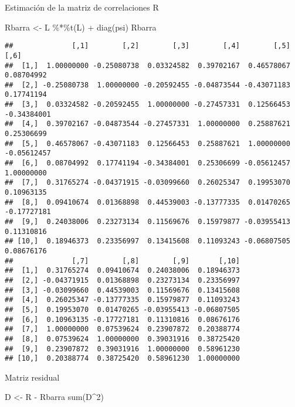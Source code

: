 \documentclass[
]{article}
\newenvironment{Shaded}{\begin{snugshade}}{\end{snugshade}}
\newcommand{\DecValTok}[1]{\textcolor[rgb]{0.00,0.00,0.81}{#1}}
\newcommand{\FunctionTok}[1]{\textcolor[rgb]{0.00,0.00,0.00}{#1}}
\newcommand{\NormalTok}[1]{#1}
\newcommand{\OtherTok}[1]{\textcolor[rgb]{0.56,0.35,0.01}{#1}}
\newcommand{\SpecialCharTok}[1]{\textcolor[rgb]{0.00,0.00,0.00}{#1}}
\begin{document}
Estimación de la matriz de correlaciones R

\begin{Shaded}
\begin{Highlighting}[]
\NormalTok{Rbarra }\OtherTok{\textless{}{-}}\NormalTok{ L }\SpecialCharTok{\%*\%}\FunctionTok{t}\NormalTok{(L) }\SpecialCharTok{+} \FunctionTok{diag}\NormalTok{(psi)}
\NormalTok{Rbarra}
\end{Highlighting}
\end{Shaded}

\begin{verbatim}
##              [,1]        [,2]        [,3]        [,4]        [,5]        [,6]
##  [1,]  1.00000000 -0.25080738  0.03324582  0.39702167  0.46578067  0.08704992
##  [2,] -0.25080738  1.00000000 -0.20592455 -0.04873544 -0.43071183  0.17741194
##  [3,]  0.03324582 -0.20592455  1.00000000 -0.27457331  0.12566453 -0.34384001
##  [4,]  0.39702167 -0.04873544 -0.27457331  1.00000000  0.25887621  0.25306699
##  [5,]  0.46578067 -0.43071183  0.12566453  0.25887621  1.00000000 -0.05612457
##  [6,]  0.08704992  0.17741194 -0.34384001  0.25306699 -0.05612457  1.00000000
##  [7,]  0.31765274 -0.04371915 -0.03099660  0.26025347  0.19953070  0.10963135
##  [8,]  0.09410674  0.01368898  0.44539003 -0.13777335  0.01470265 -0.17727181
##  [9,]  0.24038006  0.23273134  0.11569676  0.15979877 -0.03955413  0.11310816
## [10,]  0.18946373  0.23356997  0.13415608  0.11093243 -0.06807505  0.08676176
##              [,7]        [,8]        [,9]       [,10]
##  [1,]  0.31765274  0.09410674  0.24038006  0.18946373
##  [2,] -0.04371915  0.01368898  0.23273134  0.23356997
##  [3,] -0.03099660  0.44539003  0.11569676  0.13415608
##  [4,]  0.26025347 -0.13777335  0.15979877  0.11093243
##  [5,]  0.19953070  0.01470265 -0.03955413 -0.06807505
##  [6,]  0.10963135 -0.17727181  0.11310816  0.08676176
##  [7,]  1.00000000  0.07539624  0.23907872  0.20388774
##  [8,]  0.07539624  1.00000000  0.39031916  0.38725420
##  [9,]  0.23907872  0.39031916  1.00000000  0.58961230
## [10,]  0.20388774  0.38725420  0.58961230  1.00000000
\end{verbatim}

Matriz residual

\begin{Shaded}
\begin{Highlighting}[]
\NormalTok{D }\OtherTok{\textless{}{-}}\NormalTok{ R }\SpecialCharTok{{-}}\NormalTok{ Rbarra}
\FunctionTok{sum}\NormalTok{(D}\SpecialCharTok{\^{}}\DecValTok{2}\NormalTok{)}
\end{Highlighting}
\end{Shaded}
\end{document}

